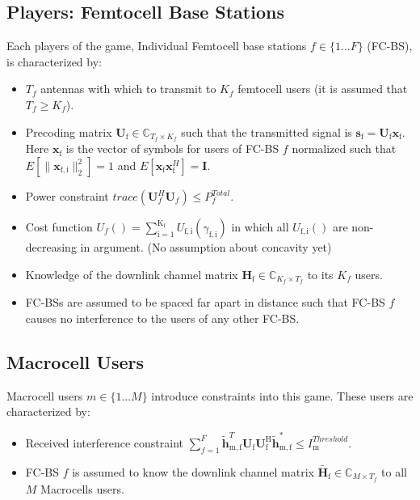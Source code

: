 \documentclass[12pt,a4paper]{report}
\begin{document}
\subsection{Players: Femtocell Base Stations}


Each players of the game, Individual Femtocell base stations $f \in \{1 ... F\}$ (FC-BS), is characterized by:
\begin{itemize}
\item 
$T_f$ antennas with which to transmit to $K_f$ femtocell users (it is assumed that $T_f \geq K_f$).
\\
\item 
	Precoding matrix $\mathbf{U}_{\mathrm{f}} \in \mathbb{C}_{T_f \times K_f}$ such that the transmitted 		
	signal is $\mathbf{s}_{\mathrm{f}
	}= \mathbf{U_{\mathrm{f}}}\mathbf{x_{\mathrm{f}}}$. Here $\mathbf{x_{\mathrm{f}}}$ is the 		
	vector of symbols for users of FC-BS $f$ normalized such that $E[\|\mathbf{x}_{\mathrm{f,i}}
	\|_2^2]=1$ and $E[\mathbf{x}_{\mathrm{f}}\mathbf{x}_{\mathrm{f}}^H]=\mathbf{I}$.
\\
\item 
	Power constraint $trace(\mathbf{U}_f^H\mathbf{U}_f) \leq P^{Total}_{f} $.

\item 
	Cost function $U_f() =
	\sum_{\mathrm{i=1}}^{\mathrm{K_f}}
    	U_{\mathrm{f,i}}(\gamma_{\mathrm{f,i}}) $
    	in which all $U_{\mathrm{f,i}}()$ are non-decreasing in argument. (No assumption about concavity yet)

\item 
	Knowledge of the downlink channel matrix $\mathbf{H_\mathrm{f}} \in \mathbb{C}_{K_f \times T_f} $ to its $K_f$ users.
\\
\item
	 FC-BSs are assumed to be spaced far apart in distance such that FC-BS $f$ 
	 causes no interference to the users of any other FC-BS.
\end{itemize}

\subsection{Macrocell Users}
Macrocell users $m \in \{1 ... M\}$ introduce constraints into this game. These users are characterized by:

\begin{itemize}
\item 
	Received interference constraint
	$\sum^F_{f=1} \mathbf{\tilde{h}}_{\mathrm{m,f}}^T  \mathbf{U_{\mathrm{f}}} 						
	\mathbf{U_{\mathrm{f}}^{\mathrm{H}}} \mathbf{\tilde{h}_{\mathrm{m,f}}^*} \leq I^{Threshold}		
	_{\mathrm{m}} $.

\item 
	FC-BS $f$ is assumed to know the downlink channel matrix $\tilde{\mathbf{H}_{\mathrm{f}}} \in \mathbb{C}_{M \times T_f}$ to all $M$ Macrocells users.
\\
\end{itemize}
\end{document}
